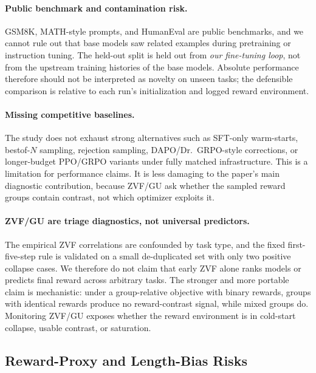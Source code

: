 \documentclass{article}
\begin{document}
\paragraph{Public benchmark and contamination risk.}
GSM8K, MATH-style prompts, and HumanEval are public benchmarks, and we cannot
rule out that base models saw related examples during pretraining or instruction
tuning.  The held-out split is held out from \emph{our fine-tuning loop}, not
from the upstream training histories of the base models.  Absolute performance
therefore should not be interpreted as novelty on unseen tasks; the defensible
comparison is relative to each run's initialization and logged reward
environment.

\paragraph{Missing competitive baselines.}
The study does not exhaust strong alternatives such as SFT-only warm-starts,
bestof-$N$ sampling, rejection sampling, DAPO/Dr.~GRPO-style corrections, or
longer-budget PPO/GRPO variants under fully matched infrastructure.  This is a
limitation for performance claims.  It is less damaging to the paper's main
diagnostic contribution, because ZVF/GU ask whether the sampled reward groups
contain contrast, not which optimizer exploits it.

\paragraph{ZVF/GU are triage diagnostics, not universal predictors.}
The empirical ZVF correlations are confounded by task type, and the fixed
first-five-step rule is validated on a small de-duplicated set with only two
positive collapse cases.  We therefore do not claim that early ZVF alone ranks
models or predicts final reward across arbitrary tasks.  The stronger and more
portable claim is mechanistic: under a group-relative objective with binary
rewards, groups with identical rewards produce no reward-contrast signal, while
mixed groups do.  Monitoring ZVF/GU exposes whether the reward environment is in
cold-start collapse, usable contrast, or saturation.

\subsection{Reward-Proxy and Length-Bias Risks}
\label{sec:length_bias}
\end{document}
